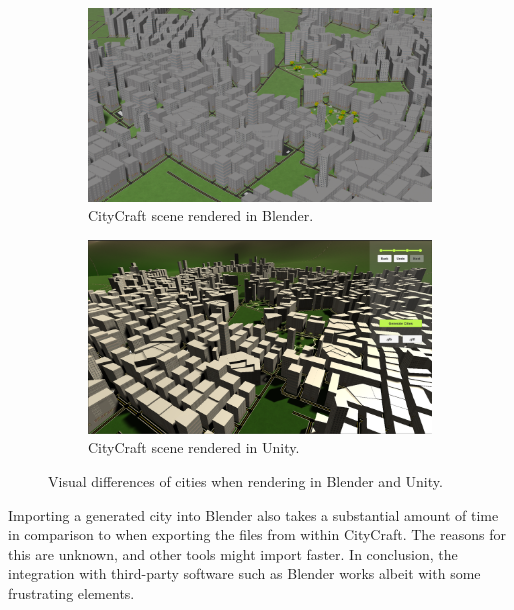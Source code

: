 \begin{figure}[H]
  \centering
  \begin{subfigure}[b]{0.45\textwidth}
    \includegraphics[width=\textwidth]{figure/blender_unity_comparison_blender}
    \caption{CityCraft scene rendered in Blender.}
  \end{subfigure}
  \quad
  \begin{subfigure}[b]{0.45\textwidth}
    \includegraphics[width=\textwidth]{figure/blender_unity_comparison_unity}
    \caption{CityCraft scene rendered in Unity.}
  \end{subfigure}
  \caption{Visual differences of cities when rendering in Blender and Unity.}
  \label{fig:blender_unity_comparison}
\end{figure}

Importing a generated city into Blender also takes a substantial amount of time in comparison to when exporting the files from within CityCraft.
The reasons for this are unknown, and other tools might import faster.
In conclusion, the integration with third-party software such as Blender works albeit with some frustrating elements.

